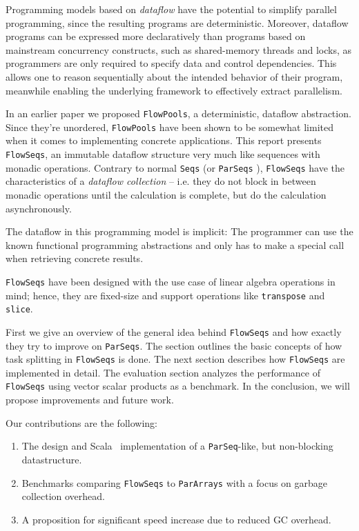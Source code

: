 \documentclass[runningheads,a4paper,fleqn]{llncs}
\begin{document}
Programming models based on \emph{dataflow} \cite{Arvind89,CnC10} have the
potential to simplify parallel programming, since the resulting programs are
deterministic. Moreover, dataflow programs can be expressed more declaratively
than programs based on mainstream concurrency constructs, such as shared-memory 
threads and locks, as programmers are only required to specify data and
control dependencies. This allows one to reason sequentially about the
intended behavior of their program, meanwhile enabling the underlying
framework to effectively extract parallelism.

In an earlier paper \cite{FP12} we proposed \texttt{FlowPools}, a
deterministic, dataflow abstraction. Since they're unordered,
\texttt{FlowPools} have been
shown to be somewhat limited when it comes to implementing concrete
applications. This report presents \texttt{FlowSeqs}, an immutable
dataflow structure very much like sequences with monadic
operations. Contrary to normal \texttt{Seqs} (or \texttt{ParSeqs}
\cite{collect11}), \texttt{FlowSeqs} have the characteristics of a
\emph{dataflow collection} -- i.e. they do not block in between
monadic operations until the calculation is complete, but do the
calculation asynchronously.

The dataflow in this programming model is implicit: The programmer can
use the known functional programming abstractions and only has to
make a special call when retrieving concrete results.

\texttt{FlowSeqs} have been designed with the use case of linear
algebra operations in mind; hence, they are fixed-size and support
operations like \texttt{transpose} and \texttt{slice}.

First we give an overview of the general idea behind \texttt{FlowSeqs} and
how exactly they try to improve on \texttt{ParSeqs}. The section outlines the
basic concepts of how task splitting in \texttt{FlowSeqs} is done. The next
section describes how \texttt{FlowSeqs} are implemented in detail. The
evaluation section analyzes the performance of \texttt{FlowSeqs} using vector
scalar products as a benchmark. In the conclusion, we will propose
improvements and future work.

Our contributions are the following:
\begin{enumerate}
\item The design and Scala~\cite{Odersky10} implementation of a
  \texttt{ParSeq}-like, but non-blocking datastructure.
\item Benchmarks comparing \texttt{FlowSeqs} to \texttt{ParArrays} with a focus on
  garbage collection overhead.
\item A proposition for significant speed increase due to reduced GC
  overhead.
\end{enumerate}
\end{document}
